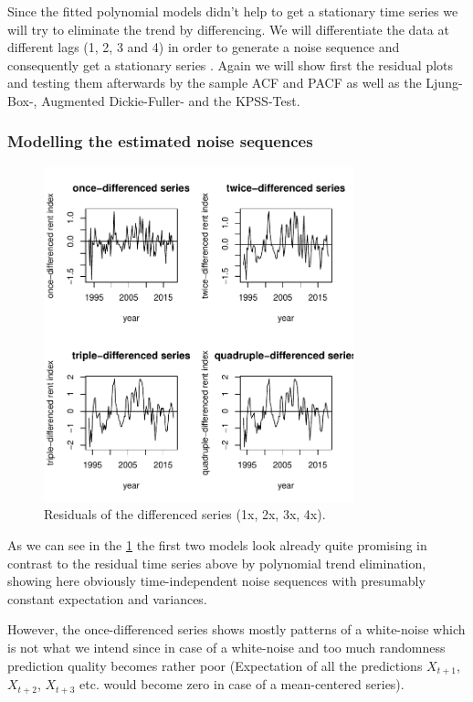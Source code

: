 \documentclass[11pt,a4paper]{article}
\begin{document}
Since the fitted polynomial models didn't help to get a stationary time series we will try to eliminate the trend by differencing.
We will differentiate the data at different lags (1, 2, 3 and 4) in order to generate a noise sequence and consequently get a stationary series \citep[p.~35]{bd02}.
Again we will show first the residual plots and testing them afterwards by the sample ACF and PACF as well as the Ljung-Box-, Augmented Dickie-Fuller- and the KPSS-Test.


\subsubsection{Modelling the estimated noise sequences}

\begin{figure}
    \centering
    \includegraphics[angle=0,width=0.8\textwidth]{resid_diff_all}
    \caption{Residuals of the differenced series (1x, 2x, 3x, 4x).}
    \label{fig:resid_diff_all}
\end{figure}

As we can see in the \cref{fig:resid_diff_all} the first two models look already quite promising in contrast to the residual time series above by polynomial trend elimination, showing here obviously time-independent noise sequences with presumably constant expectation and variances.

However, the once-differenced series shows mostly patterns of a white-noise which is not what we intend since in case of a white-noise and too much randomness prediction quality becomes rather poor (Expectation of all the predictions $X_{t+1}$, $X_{t+2}$, $X_{t+3}$ etc. would become zero in case of a mean-centered series).
\end{document}
